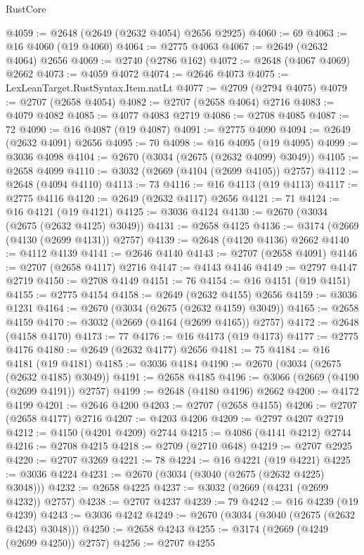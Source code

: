 \begin{lexlean}{RustCore}
\begin{coremodule}
@4059 := @2648 (@2649 (@2632 @4054) @2656 @2925)
@4060 := 69
@4063 := @16 @4060 (@19 @4060)
@4064 := @2775 @4063
@4067 := @2649 (@2632 @4064) @2656
@4069 := @2740 (@2786 @162)
@4072 := @2648 (@4067 @4069) @2662
@4073 := @4059 @4072
@4074 := @2646 @4073
@4075 := LexLeanTarget.RustSyntax.Item.natLt
@4077 := @2709 (@2794 @4075)
@4079 := @2707 (@2658 @4054)
@4082 := @2707 (@2658 @4064) @2716
@4083 := @4079 @4082
@4085 := @4077 @4083 @2719
@4086 := @2708 @4085
@4087 := 72
@4090 := @16 @4087 (@19 @4087)
@4091 := @2775 @4090
@4094 := @2649 (@2632 @4091) @2656
@4095 := 70
@4098 := @16 @4095 (@19 @4095)
@4099 := @3036 @4098
@4104 := @2670 (@3034 (@2675 (@2632 @4099) @3049))
@4105 := @2658 @4099
@4110 := @3032 (@2669 (@4104 (@2699 @4105)) @2757)
@4112 := @2648 (@4094 @4110)
@4113 := 73
@4116 := @16 @4113 (@19 @4113)
@4117 := @2775 @4116
@4120 := @2649 (@2632 @4117) @2656
@4121 := 71
@4124 := @16 @4121 (@19 @4121)
@4125 := @3036 @4124
@4130 := @2670 (@3034 (@2675 (@2632 @4125) @3049))
@4131 := @2658 @4125
@4136 := @3174 (@2669 (@4130 (@2699 @4131)) @2757)
@4139 := @2648 (@4120 @4136) @2662
@4140 := @4112 @4139
@4141 := @2646 @4140
@4143 := @2707 (@2658 @4091)
@4146 := @2707 (@2658 @4117) @2716
@4147 := @4143 @4146
@4149 := @2797 @4147 @2719
@4150 := @2708 @4149
@4151 := 76
@4154 := @16 @4151 (@19 @4151)
@4155 := @2775 @4154
@4158 := @2649 (@2632 @4155) @2656
@4159 := @3036 @1231
@4164 := @2670 (@3034 (@2675 (@2632 @4159) @3049))
@4165 := @2658 @4159
@4170 := @3032 (@2669 (@4164 (@2699 @4165)) @2757)
@4172 := @2648 (@4158 @4170)
@4173 := 77
@4176 := @16 @4173 (@19 @4173)
@4177 := @2775 @4176
@4180 := @2649 (@2632 @4177) @2656
@4181 := 75
@4184 := @16 @4181 (@19 @4181)
@4185 := @3036 @4184
@4190 := @2670 (@3034 (@2675 (@2632 @4185) @3049))
@4191 := @2658 @4185
@4196 := @3066 (@2669 (@4190 (@2699 @4191)) @2757)
@4199 := @2648 (@4180 @4196) @2662
@4200 := @4172 @4199
@4201 := @2646 @4200
@4203 := @2707 (@2658 @4155)
@4206 := @2707 (@2658 @4177) @2716
@4207 := @4203 @4206
@4209 := @2797 @4207 @2719
@4212 := @4150 (@4201 @4209) @2744
@4215 := @4086 (@4141 @4212) @2744
@4216 := @2708 @4215
@4218 := @2709 (@2710 @648)
@4219 := @2707 @2925
@4220 := @2707 @3269
@4221 := 78
@4224 := @16 @4221 (@19 @4221)
@4225 := @3036 @4224
@4231 := @2670 (@3034 (@3040 (@2675 (@2632 @4225) @3048)))
@4232 := @2658 @4225
@4237 := @3032 (@2669 (@4231 (@2699 @4232)) @2757)
@4238 := @2707 @4237
@4239 := 79
@4242 := @16 @4239 (@19 @4239)
@4243 := @3036 @4242
@4249 := @2670 (@3034 (@3040 (@2675 (@2632 @4243) @3048)))
@4250 := @2658 @4243
@4255 := @3174 (@2669 (@4249 (@2699 @4250)) @2757)
@4256 := @2707 @4255

\end{coremodule}
\end{lexlean}
